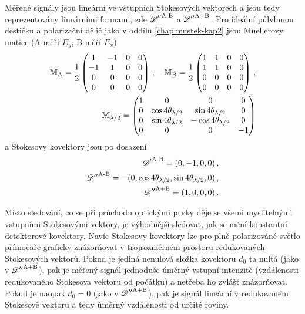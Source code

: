 Měřené signály jsou lineární ve vstupních Stokesových vektorech a jsou tedy reprezentovány lineárními formami, zde ${\mathscr{D}''}^\textrm{A-B}$ a ${\mathscr{D}''}^\textrm{A+B}$.
Pro ideální půlvlnnou destičku a polarizační dělič jako v oddílu \ref{chap:mustek-kap2} jsou Muellerovy matice (A měří $E_y$, B měří $E_x$)
\begin{align}
    \mathbb{M}_\textrm{A} = \frac{1}{2}\begin{pmatrix} 1&-1&0&0 \\ -1&1&0&0 \\ 0&0&0&0 \\ 0&0&0&0 \end{pmatrix} \,,\quad 
    \mathbb{M}_\textrm{B} = \frac{1}{2}\begin{pmatrix} 1&1&0&0 \\ 1&1&0&0 \\ 0&0&0&0 \\ 0&0&0&0 \end{pmatrix} \,, \\
    \mathbb{M}_{\lambda/2} = \begin{pmatrix} 1&0&0&0 \\ 0&\cos4\theta_{\lambda/2}&\sin4\theta_{\lambda/2}&0 \\ 0&\sin4\theta_{\lambda/2}&-\cos4\theta_{\lambda/2}&0 \\ 0&0&0&-1 \end{pmatrix}
\end{align}
a Stokesovy kovektory jsou po dosazení
\begin{align}
    {\mathscr{D}'}^\textrm{A-B}=(0, -1, 0, 0) \,, \\
    {\mathscr{D}''}^\textrm{A-B}=-(0, \cos4\theta_{\lambda/2}, \sin4\theta_{\lambda/2}, 0) \,, \label{eqn:Uab-Mueller} \\
    {\mathscr{D}''}^\textrm{A+B}=(1, 0, 0, 0) \,.
\end{align}

Místo sledování, co se při průchodu optickými prvky děje se všemi myslitelnými vstupními Stokesovými vektory, je výhodnější sledovat, jak se mění konstantní detektorové kovektory.
Navíc Stokesovy kovektory lze pro plně polarizováné světlo přímočaře graficky znázorňovat v trojrozměrném prostoru redukovaných Stokesových vektorů.
Pokud je jediná nenulová složka kovektoru $d_0$ ta nultá (jako v ${\mathscr{D}''}^\textrm{A+B}$), pak je měřený signál jednoduše úměrný vstupní intenzitě (vzdálenosti redukovaného Stokesova vektoru od počátku) a netřeba ho zvlášť znázorňovat.
Pokud je naopak $d_0=0$ (jako v ${\mathscr{D}''}^\textrm{A+B}$), pak je signál lineární v redukovaném Stokesově vektoru a tedy úměrný vzdálenosti od určité roviny.

